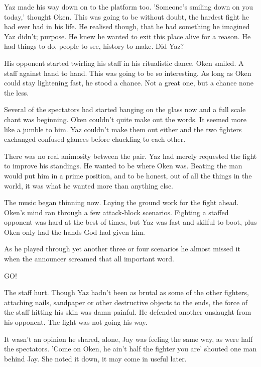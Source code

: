 Yaz made his way down on to the platform too.  'Someone's smiling down on you today,' thought Oken.  This was going to be without doubt, the hardest fight he had ever had in his life.  He realised though, that he had something he imagined Yaz didn't; purpose.  He knew he wanted to exit this place alive for a reason.  He had things to do, people to see, history to make.  Did Yaz?

His opponent started twirling his staff in his ritualistic dance.  Oken smiled.  A staff against hand to hand.  This was going to be so interesting.  As long as Oken could stay lightening fast, he stood a chance.  Not a great one, but a chance none the less.

Several of the spectators had started banging on the glass now and a full scale chant was beginning.  Oken couldn't quite make out the words.  It seemed more like a jumble to him.  Yaz couldn't make them out either and the two fighters exchanged confused glances before chuckling to each other.

There was no real animosity between the pair.  Yaz had merely requested the fight to improve his standings.  He wanted to be where Oken was.  Beating the man would put him in a prime position, and to be honest, out of all the things in the world, it was what he wanted more than anything else.

The music began thinning now.  Laying the ground work for the fight ahead.  Oken's mind ran through a few attack-block scenarios.  Fighting a staffed opponent was hard at the best of times, but Yaz was fast and skilful to boot, plus Oken only had the hands God had given him.

As he played through yet another three or four scenarios he almost missed it when the announcer screamed that all important word.

GO!



\thoughtbreak



The staff hurt.  Though Yaz hadn't been as brutal as some of the other fighters, attaching nails, sandpaper or other destructive objects to the ends, the force of the staff hitting his skin was damn painful.  He defended another onslaught from his opponent.  The fight was not going his way.

It wasn't an opinion he shared, alone, Jay was feeling the same way, as were half the spectators.  'Come on Oken, he ain't half the fighter you are' shouted one man behind Jay.  She noted it down, it may come in useful later.  

